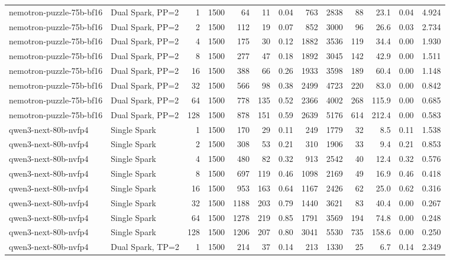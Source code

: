\begin{tabular}{l l r r r r r r r r r r r}
nemotron-puzzle-75b-bf16 & Dual Spark, PP=2 & 1 & 1500 & 64\rlap{$^\dagger$} & 11 & 0.04 & 763 & 2838 & 88 & 23.1 & 0.04 & 4.924 \\
nemotron-puzzle-75b-bf16 & Dual Spark, PP=2 & 2 & 1500 & 112 & 19 & 0.07 & 852 & 3000 & 96 & 26.6 & 0.03 & 2.734 \\
nemotron-puzzle-75b-bf16 & Dual Spark, PP=2 & 4 & 1500 & 175 & 30 & 0.12 & 1882 & 3536 & 119 & 34.4 & 0.00 & 1.930 \\
nemotron-puzzle-75b-bf16 & Dual Spark, PP=2 & 8 & 1500 & 277 & 47 & 0.18 & 1892 & 3045 & 142 & 42.9 & 0.00 & 1.511 \\
nemotron-puzzle-75b-bf16 & Dual Spark, PP=2 & 16 & 1500 & 388 & 66 & 0.26 & 1933 & 3598 & 189 & 60.4 & 0.00 & 1.148 \\
nemotron-puzzle-75b-bf16 & Dual Spark, PP=2 & 32 & 1500 & 566 & 98 & 0.38 & 2499 & 4723 & 220 & 83.0 & 0.00 & 0.842 \\
nemotron-puzzle-75b-bf16 & Dual Spark, PP=2 & 64 & 1500 & 778 & 135 & 0.52 & 2366 & 4002 & 268 & 115.9 & 0.00 & 0.685 \\
nemotron-puzzle-75b-bf16 & Dual Spark, PP=2 & 128 & 1500 & 878 & 151 & 0.59 & 2639 & 5176 & 614 & 212.4 & 0.00 & 0.583 \\
\addlinespace
qwen3-next-80b-nvfp4 & Single Spark & 1 & 1500 & 170 & 29 & 0.11 & 249 & 1779 & 32 & 8.5 & 0.11 & 1.538 \\
qwen3-next-80b-nvfp4 & Single Spark & 2 & 1500 & 308 & 53 & 0.21 & 310 & 1906 & 33 & 9.4 & 0.21 & 0.853 \\
qwen3-next-80b-nvfp4 & Single Spark & 4 & 1500 & 480 & 82 & 0.32 & 913 & 2542 & 40 & 12.4 & 0.32 & 0.576 \\
qwen3-next-80b-nvfp4 & Single Spark & 8 & 1500 & 697 & 119 & 0.46 & 1098 & 2169 & 49 & 16.9 & 0.46 & 0.418 \\
qwen3-next-80b-nvfp4 & Single Spark & 16 & 1500 & 953 & 163 & 0.64 & 1167 & 2426 & 62 & 25.0 & 0.62 & 0.316 \\
qwen3-next-80b-nvfp4 & Single Spark & 32 & 1500 & 1188 & 203 & 0.79 & 1440 & 3621 & 83 & 40.4 & 0.00 & 0.267 \\
qwen3-next-80b-nvfp4 & Single Spark & 64 & 1500 & 1278 & 219 & 0.85 & 1791 & 3569 & 194 & 74.8 & 0.00 & 0.248 \\
qwen3-next-80b-nvfp4 & Single Spark & 128 & 1500 & 1206 & 207 & 0.80 & 3041 & 5530 & 735 & 158.6 & 0.00 & 0.250 \\
\addlinespace
qwen3-next-80b-nvfp4 & Dual Spark, TP=2 & 1 & 1500 & 214 & 37 & 0.14 & 213 & 1330 & 25 & 6.7 & 0.14 & 2.349 \\

\end{tabular}

